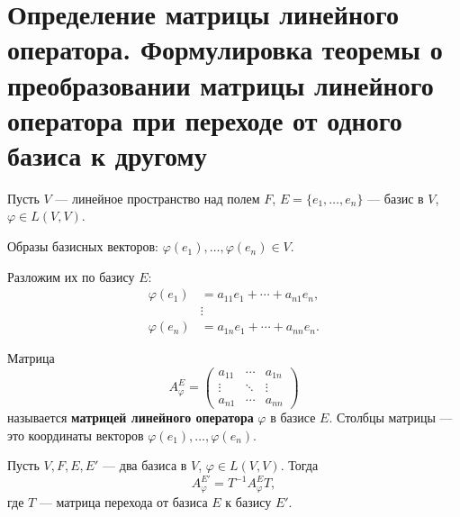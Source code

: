 \section{Определение матрицы линейного оператора. Формулировка теоремы о преобразовании матрицы линейного оператора при переходе от одного базиса к другому}

\begin{definition}
Пусть $V$ --- линейное пространство над полем $F$, $E = \{e_1, \ldots, e_n\}$ --- базис в $V$, $\varphi \in L(V, V)$.

Образы базисных векторов: $\varphi(e_1), \ldots, \varphi(e_n) \in V$.

Разложим их по базису $E$:
\begin{align*}
\varphi(e_1) &= a_{11}e_1 + \cdots + a_{n1}e_n, \\
&\vdots \\
\varphi(e_n) &= a_{1n}e_1 + \cdots + a_{nn}e_n.
\end{align*}

Матрица
\[
A_\varphi^E = \begin{pmatrix}
a_{11} & \cdots & a_{1n} \\
\vdots & \ddots & \vdots \\
a_{n1} & \cdots & a_{nn}
\end{pmatrix}
\]
называется \textbf{матрицей линейного оператора} $\varphi$ в базисе $E$. Столбцы матрицы --- это координаты векторов $\varphi(e_1), \ldots, \varphi(e_n)$.
\end{definition}

\begin{theorem}
Пусть $V, F, E, E'$ --- два базиса в $V$, $\varphi \in L(V, V)$. Тогда
\[
A_\varphi^{E'} = T^{-1} A_\varphi^E T,
\]
где $T$ --- матрица перехода от базиса $E$ к базису $E'$.
\end{theorem}
